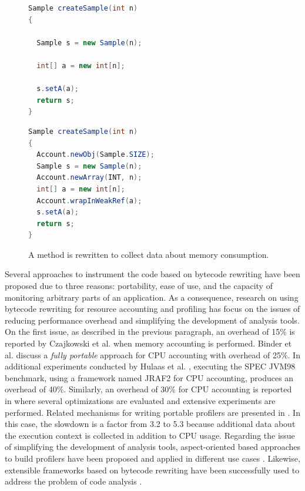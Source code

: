 \begin{figure}[ht]
\begin{mdframed}
\begin{minipage}[t]{0.45\textwidth}
\begin{lstlisting}[language=java,basicstyle=\footnotesize]
Sample createSample(int n)
{

  Sample s = new Sample(n);

  int[] a = new int[n];

  s.setA(a);
  return s;
}
\end{lstlisting}
\end{minipage}
\hspace{0.6cm}
\begin{minipage}[t]{0.45\textwidth}
\begin{lstlisting}[language=java,basicstyle=\footnotesize]
Sample createSample(int n)
{
  Account.newObj(Sample.SIZE);
  Sample s = new Sample(n);
  Account.newArray(INT, n);
  int[] a = new int[n];
  Account.wrapInWeakRef(a);
  s.setA(a);
  return s;
}
\end{lstlisting}
\end{minipage}
\end{mdframed}
\caption{A method is rewritten to collect data about memory consumption.}\label{lst:bytecode-rewriting}
\end{figure}

Several approaches to instrument the code based on bytecode rewriting have been proposed due to three reasons: portability, ease of use, and the capacity of monitoring arbitrary parts of an application.
As a consequence, research on using bytecode rewriting for resource accounting and profiling has focus on the issues of reducing performance overhead and simplifying the development of analysis tools.
On the first issue, as described in the previous paragraph, an overhead of 15\% is reported by Czajkowski et al. \cite{czajkowski_jres:_1998} when memory accounting is performed.
Binder et al. \cite{binder_portable_2001} discuss a \textit{fully portable} approach for CPU accounting with overhead of 25\%.
In additional experiments conducted by Hulaas et al. \cite{Hulaas:2004:PTP:1014007.1014024,Hulaas:2008:PTL}, executing the SPEC JVM98 benchmark, using a framework named JRAF2 for CPU accounting, produces an overhead of 40\%.
Similarly, an overhead of 30\% for CPU accounting is reported in \cite{Binder200657,Hulaas:2008:PTL} where several optimizations are evaluated and extensive experiments are performed.
Related mechanisms for writing portable profilers are presented in \cite{Binder:2009:PPV:1464245.1464249,Binder200645}.
In this case, the slowdown is a factor from 3.2 to 5.3 because additional data about the execution context is collected in addition to CPU usage.  
Regarding the issue of simplifying the development of analysis tools, aspect-oriented based approaches to build profilers have been proposed and applied in different use cases \cite{Pearce:2007:PA:1248445.1248448,Ansaloni:2010:RDE:1712605.1712616}.
Likewise, extensible frameworks based on bytecode rewriting have been successfully used to address the problem of code analysis \cite{Binder:2006:FEM:1173706.1173733,Maebe06javana:a, Marek:2012:DEL:2162037.2162046}.

